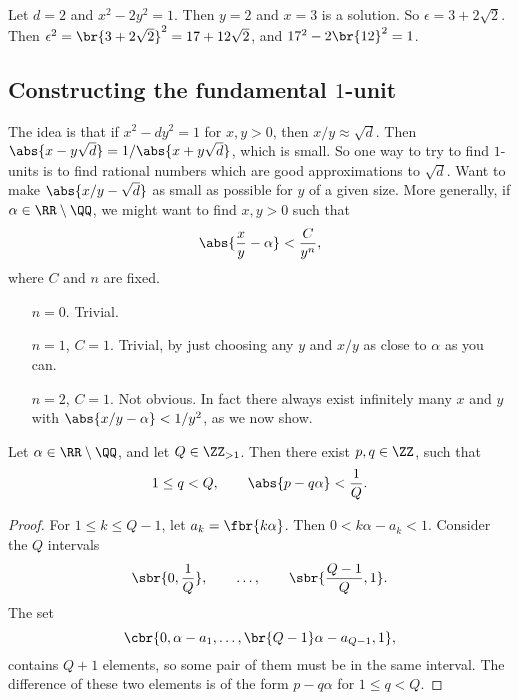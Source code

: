 \begin{example*}
Let $ d = 2 $ and $ x^2 - 2y^2 = 1 $. Then $ y = 2 $ and $ x = 3 $ is a solution. So $ \epsilon = 3 + 2\sqrt{2} $. Then $ \epsilon^2 = \br{3 + 2\sqrt{2}}^2 = 17 + 12\sqrt{2} $, and $ 17^2 - 2\br{12}^2 = 1 $.
\end{example*}

\subsection{Constructing the fundamental \texorpdfstring{$ 1 $}{1}-unit}

The idea is that if $ x^2 - dy^2 = 1 $ for $ x, y > 0 $, then $ x / y \approx \sqrt{d} $. Then $ \abs{x - y\sqrt{d}} = 1 / \abs{x + y\sqrt{d}} $, which is small. So one way to try to find $ 1 $-units is to find rational numbers which are good approximations to $ \sqrt{d} $. Want to make $ \abs{x / y - \sqrt{d}} $ as small as possible for $ y $ of a given size. More generally, if $ \alpha \in \RR \setminus \QQ $, we might want to find $ x, y > 0 $ such that
$$ \abs{\dfrac{x}{y} - \alpha} < \dfrac{C}{y^n}, $$
where $ C $ and $ n $ are fixed.
\begin{itemize}[leftmargin=1in]
\item[$ n = 0 $.] Trivial.
\item[$ n = 1 $, $ C = 1 $.] Trivial, by just choosing any $ y $ and $ x / y $ as close to $ \alpha $ as you can.
\item[$ n = 2 $, $ C = 1 $.] Not obvious. In fact there always exist infinitely many $ x $ and $ y $ with $ \abs{x / y - \alpha} < 1 / y^2 $, as we now show.
\end{itemize}

\begin{theorem}
\label{thm:65}
Let $ \alpha \in \RR \setminus \QQ $, and let $ Q \in \ZZ_{> 1} $. Then there exist $ p, q \in \ZZ $, such that
$$ 1 \le q < Q, \qquad \abs{p - q\alpha} < \dfrac{1}{Q}. $$
\end{theorem}

\begin{proof}
For $ 1 \le k \le Q - 1 $, let $ a_k = \fbr{k\alpha} $. Then $ 0 < k\alpha - a_k < 1 $. Consider the $ Q $ intervals
$$ \sbr{0, \dfrac{1}{Q}}, \qquad \dots, \qquad \sbr{\dfrac{Q - 1}{Q}, 1}. $$
The set
$$ \cbr{0, \alpha - a_1, \dots, \br{Q - 1}\alpha - a_{Q - 1}, 1}, $$
contains $ Q + 1 $ elements, so some pair of them must be in the same interval. The difference of these two elements is of the form $ p - q\alpha $ for $ 1 \le q < Q $.
\end{proof}

